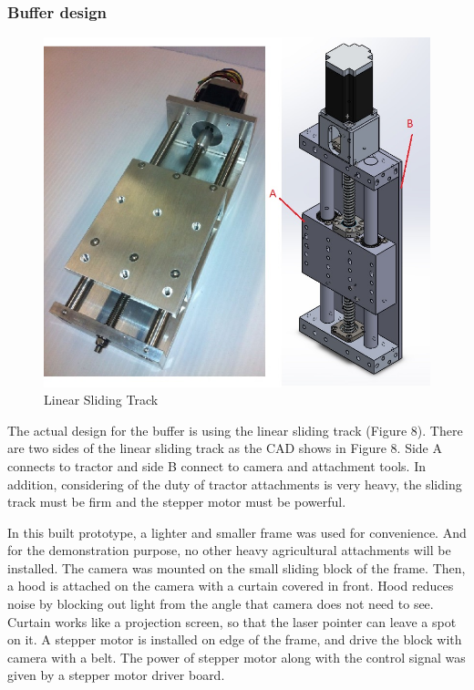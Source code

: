 \documentclass[12pt]{article}
\begin{document}
\begin{flushleft}
\subsubsection{Buffer design}
\begin{figure}[ht!]
	\begin{center}
		\includegraphics[scale = 0.6]{1D.jpg}
		\caption{Linear Sliding Track}
	\end{center}
\end{figure}
The actual design for the buffer is using the linear sliding track (Figure 8). There are two sides of the linear sliding track as the CAD shows in Figure 8. Side A connects to tractor and side B connect to camera and attachment tools. In addition, considering of the duty of tractor attachments is very heavy, the sliding track must be firm and the stepper motor must be powerful.

In this built prototype, a lighter and smaller frame was used for convenience. And for the demonstration purpose, no other heavy agricultural attachments will be installed. The camera was mounted on the small sliding block of the frame. Then, a hood is attached on the camera with a curtain covered in front. Hood reduces noise by blocking out light from the angle that camera does not need to see. Curtain works like a projection screen, so that the laser pointer can leave a spot on it.  A stepper motor is installed on edge of the frame, and drive the block with camera with a belt. The power of stepper motor along with the control signal was given by a stepper motor driver board. 


\end{flushleft}
\end{document}

